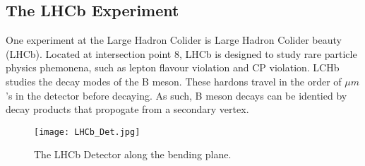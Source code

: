   \subsection{The LHCb Experiment}

    One experiment at the Large Hadron Colider is Large Hadron Colider beauty (LHCb).
    Located at intersection point 8, LHCb is designed to study rare particle physics phemonena, such as lepton flavour violation and CP violation. 
    LCHb studies the decay modes of the B meson.
    These hardons travel in the order of $\mu m$'s in the detector before decaying. 
    As such, B meson decays can be identied by decay products that propogate from a secondary vertex.

    \begin{figure}[h!]
      \centering
      \texttt{[image: LHCb\_Det.jpg]}
      \caption{The LHCb Detector along the bending plane.}
      \label{fig:LHCb_Collab}
    \end{figure}

